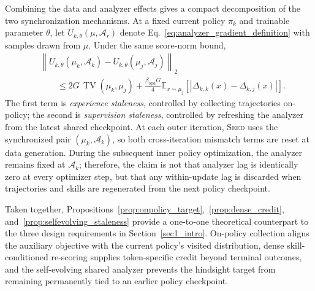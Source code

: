 Combining the data and analyzer effects gives a compact decomposition of the two synchronization mechanisms. At a fixed current policy $\pi_k$ and trainable parameter $\theta$, let
$U_{k,\theta}(\mu,\mathcal A_r)$
denote Eq.~\ref{eq:analyzer_gradient_definition} with samples drawn from $\mu$. Under the same score-norm bound,
\begin{equation}
 \begin{aligned}
 &\left\|
 U_{k,\theta}(\mu_k,\mathcal A_k)
 -
 U_{k,\theta}(\mu_j,\mathcal A_j)
 \right\|_2
 \\
 &\qquad\le
 2G\,\operatorname{TV}(\mu_k,\mu_j)
 +
 \frac{\beta_{\mathrm{opd}}G}{4}
 \mathbb E_{x\sim\mu_j}
 \left[
 |\Delta_{k,k}(x)-\Delta_{k,j}(x)|
 \right].
 \end{aligned}
 \label{eq:joint_staleness_decomposition}
\end{equation}
The first term is \emph{experience staleness}, controlled by collecting trajectories on-policy; the second is \emph{supervision staleness}, controlled by refreshing the analyzer from the latest shared checkpoint. At each outer iteration, \textsc{Seed} uses the synchronized pair $(\mu_k,\mathcal A_k)$, so both cross-iteration mismatch terms are reset at data generation. During the subsequent inner policy optimization, the analyzer remains fixed at $\mathcal A_k$; therefore, the claim is not that analyzer lag is identically zero at every optimizer step, but that any within-update lag is discarded when trajectories and skills are regenerated from the next policy checkpoint.

Taken together, Propositions~\ref{prop:onpolicy_target},~\ref{prop:dense_credit}, and~\ref{prop:selfevolving_staleness} provide a one-to-one theoretical counterpart to the three design requirements in Section~\ref{sec1_intro}. On-policy collection aligns the auxiliary objective with the current policy's visited distribution, dense skill-conditioned re-scoring supplies token-specific credit beyond terminal outcomes, and the self-evolving shared analyzer prevents the hindsight target from remaining permanently tied to an earlier policy checkpoint.

